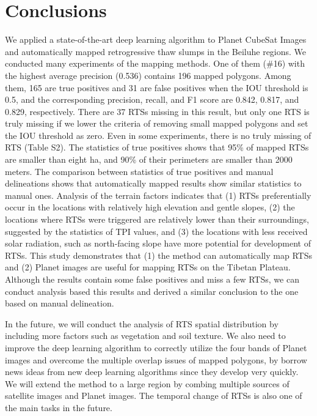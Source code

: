 \documentclass[preprint,12pt,authoryear]{elsarticle}
\begin{document}
\section{Conclusions}
\label{sec_conclusion}

We applied a state-of-the-art deep learning algorithm to Planet CubeSat Images and automatically mapped retrogressive thaw slumps in the Beiluhe regions. We conducted many experiments of the mapping methods. One of them (\#16) with the highest average precision (0.536) contains 196 mapped polygons. Among them, 165 are true positives and 31 are false positives when the IOU threshold is 0.5, and the corresponding precision, recall, and F1 score are 0.842, 0.817, and 0.829, respectively. There are 37 RTSs missing in this result, but only one RTS is truly missing if we lower the criteria of removing small mapped polygons and set the IOU threshold as zero. Even in some experiments, there is no truly missing of RTS (Table S2). The statistics of true positives shows that 95\% of mapped RTSs are smaller than eight ha, and 90\% of their perimeters are smaller than 2000 meters. The comparison between statistics of true positives and manual delineations shows that automatically mapped results show similar statistics to manual ones. Analysis of the terrain factors indicates that (1) RTSs preferentially occur in the locations with relatively high elevation and gentle slopes, (2) the locations where RTSs were triggered are relatively lower than their surroundings, suggested by the statistics of TPI values, and (3) the locations with less received solar radiation, such as north-facing slope have more potential for development of RTSs. This study demonstrates that (1) the method can automatically map RTSs and (2) Planet images are useful for mapping RTSs on the Tibetan Plateau. Although the results contain some false positives and miss a few RTSs, we can conduct analysis based this results and derived a similar conclusion to the one based on manual delineation. 

In the future, we will conduct the analysis of RTS spatial distribution by including more factors such as vegetation and soil texture. We also need to improve the deep learning algorithm to correctly utilize the four bands of Planet images and overcome the multiple overlap issues of mapped polygons, by borrow news ideas from new deep learning algorithms since they develop very quickly. We will extend the method to a large region by combing multiple sources of satellite images and Planet images. The temporal change of RTSs is also one of the main tasks in the future. 
\end{document}
